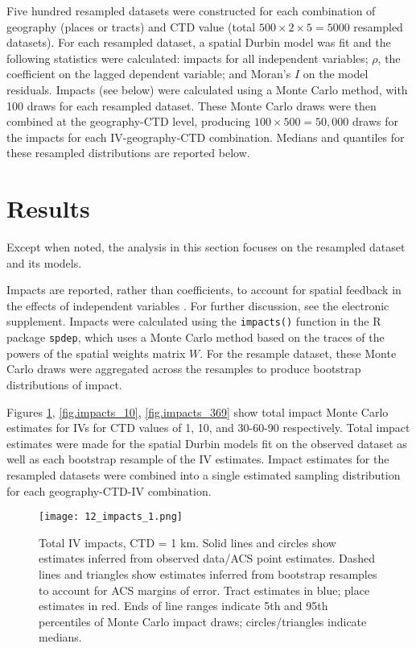 \documentclass[ijerph,article,submit,oneauthor,pdftex]{Definitions/mdpi}
\begin{document}
Five hundred resampled datasets were constructed for each combination of geography (places or tracts) and CTD value (total \(500 \times 2 \times 5 = 5000\) resampled datasets). For each resampled dataset, a spatial Durbin model was fit and the following statistics were calculated: impacts for all independent variables; \(\rho\), the coefficient on the lagged dependent variable; and Moran's \(I\) on the model residuals. Impacts (see below) were calculated using a Monte Carlo method, with 100 draws for each resampled dataset. These Monte Carlo draws were then combined at the geography-CTD level, producing \(100 \times 500 = 50,000\) draws for the impacts for each IV-geography-CTD combination. Medians and quantiles for these resampled distributions are reported below.

\hypertarget{results}{%
\section{Results}\label{results}}

Except when noted, the analysis in this section focuses on the resampled dataset and its models.

Impacts are reported, rather than coefficients, to account for spatial feedback in the effects of independent variables \citep[§2.7]{LeSageIntroductionSpatialEconometrics2009}. For further discussion, see the electronic supplement. Impacts were calculated using the \texttt{impacts()} function in the R package \texttt{spdep}, which uses a Monte Carlo method based on the traces of the powers of the spatial weights matrix \(W\). For the resample dataset, these Monte Carlo draws were aggregated across the resamples to produce bootstrap distributions of impact.

Figures \ref{fig.impacts_1}, \ref{fig.impacts_10}, \ref{fig.impacts_369} show total impact Monte Carlo estimates for IVs for CTD values of 1, 10, and 30-60-90 respectively. Total impact estimates were made for the spatial Durbin models fit on the observed dataset as well as each bootstrap resample of the IV estimates. Impact estimates for the resampled datasets were combined into a single estimated sampling distribution for each geography-CTD-IV combination.

\begin{figure}
\centering
\texttt{[image: 12\_impacts\_1.png]}
\caption{Total IV impacts, CTD = 1 km. Solid lines and circles show estimates inferred from observed data/ACS point estimates. Dashed lines and triangles show estimates inferred from bootstrap resamples to account for ACS margins of error. Tract estimates in blue; place estimates in red. Ends of line ranges indicate 5th and 95th percentiles of Monte Carlo impact draws; circles/triangles indicate medians.\label{fig.impacts_1}}
\end{figure}
\end{document}
